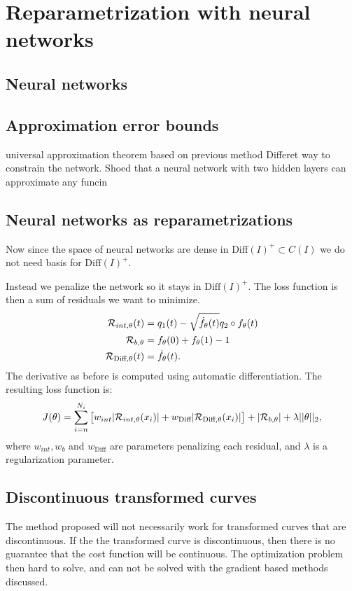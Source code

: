 
\section{Reparametrization with neural networks}
\subsection{Neural networks}


\subsection{Approximation error bounds}
universal approximation theorem
based on previous method
Differet way to constrain the network.
\cite[Theomrem 5.1]{ryck2021} Shoed that a neural network with two hidden layers can approximate any funcin 

\subsection{Neural networks as reparametrizations}
Now since the space of neural networks are dense in  \(\text{Diff}(I)^+ \subset C(I)\) we do not need basis for  \(\text{Diff}(I)^+\). 
  
Instead we penalize the network so it stays in  \(\text{Diff}(I)^+\). 
The loss function is then a sum of residuals we want to minimize.
\begin{align}
  {\cal R}_{int,\theta}(t)&= q_1(t) - \sqrt{\dot f_\theta(t)}q_2 \circ f_\theta(t) \\
  {\cal R}_{b,\theta}&= f_\theta(0) + f_\theta(1) - 1\\ 
  {\cal R}_{\text{Diff},\theta}(t)&= \dot f_{\theta}(t).
\end{align}
The derivative as before is computed using automatic differentiation. The resulting loss function is: 
\begin{equation}
  J(\theta) = \sum_{i=n}^{N_i}\big[w_{int}|{\cal R}_{int,\theta}(x_i)| +  w_{\text{Diff}}|{\cal R}_{\text{Diff}, \theta}(x_i)|\big]  +|{\cal R}_{b,\theta}|  + \lambda||\theta||_2,
\end{equation}
where  \(w_{int}, w_{b} \) and  \(w_{\text{Diff}}\) are parameters penalizing each residual, and   \(\lambda\) is a regularization parameter. 
\subsection{Discontinuous transformed curves}
The method proposed will not necessarily work for transformed curves that are discontinuous. If the the transformed curve is discontinuous, then there is no guarantee that the cost function will be continuous. The optimization problem then hard to solve, and can not be solved with the gradient based methods discussed.

